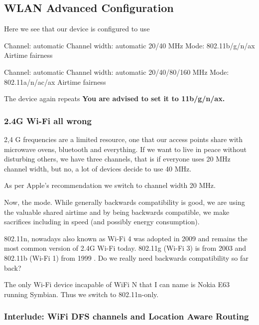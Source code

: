 \documentclass[../wifi-security.tex]{subfiles}
\begin{document}


\subsection{WLAN Advanced Configuration}

Here we see that our device is configured to use

Channel: automatic
Channel width: automatic 20/40 MHz
Mode: 802.11b/g/n/ax
Airtime fairness

Channel: automatic
Channel width: automatic 20/40/80/160 MHz
Mode: 802.11a/n/ac/ax
Airtime fairness

The device again repeats \textbf{You are advised to set it to 11b/g/n/ax.}

\subsubsection{2.4G Wi-Fi all wrong}

2,4 G frequencies are a limited resource, one that our access points share with microwave ovens, bluetooth and everything. If we want to live in peace without disturbing others, we have three channels, that is if everyone uses 20 MHz channel width, but no, a lot of devices decide to use 40 MHz.

As per Apple's recommendation we switch to channel width 20 MHz.\autocite{appleap}

Now, the mode. While generally backwards compatibility is good, we are using the valuable shared airtime and by being backwards compatible, we make sacrifices including in speed (and possibly energy consumption). \autocite{doubleedgedbackwards}

802.11n, nowadays also known as Wi-Fi 4 was adopted in 2009 and remains the most common version of 2.4G Wi-Fi today. 802.11g (Wi-Fi 3) is from 2003 and 802.11b (Wi-Fi 1) from 1999 \autocite{wikipediawifi6}. Do we really need backwards compatibility so far back?

The only Wi-Fi device incapable of WiFi N that I can name is Nokia E63 running Symbian. Thus we switch to 802.11n-only.

\subsubsection{Interlude: WiFi DFS channels and Location Aware Routing}
\end{document}
